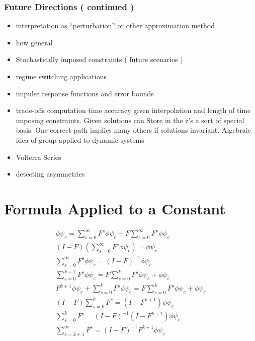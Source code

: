 \documentclass{beamer}
\begin{document}
   \begin{frame}
     \frametitle{Future Directions ( continued )}
     \begin{itemize}
\item interpretation as ``perturbation'' or other approximation method
\item how general
\item Stochastically imposed constraints ( future scenarios )
\item regime switching applications
\item impulse response functions and error bounds
\item trade-offs computation time accuracy given interpolation and length of time imposing constraints.  Given solutions can Store in the z's a sort of special basis. One correct path implies many others if solutions invariant.   Algebraic idea of group applied to dynamic systems
\item Volterra Series
\item detecting asymmetries
     \end{itemize}
   \end{frame}


   \begin{frame}





 
 
     
   \end{frame}






\newpage
\section{Formula Applied to a Constant}
{\tiny
\begin{gather*}
\phi \psi_c=  \sum_{s=0}^\infty F^s \phi \psi_c  -   F \sum_{s=0}^\infty F^s \phi \psi_c \\
(I-F) \left (\sum_{s=0}^\infty F^s \phi \psi_c \right ) =\phi \psi_c\\
\sum_{s=0}^\infty F^s \phi \psi_c=(I - F)^{-1}\phi \psi_c\\
\sum_{s=0}^{k+1} F^s \phi \psi_c=F \sum_{s=0}^{k} F^s \phi \psi_c + \phi \psi_c\\
F^{k+1} \phi \psi_c +\sum_{s=0}^{k} F^s \phi \psi_c=F \sum_{s=0}^{k} F^s \phi \psi_c + \phi \psi_c\\
(I -F)\sum_{s=0}^{k} F^s  = (I- F^{k+1}) \phi \psi_c\\
\sum_{s=0}^{k} F^s  = (I -F)^{-1}(I- F^{k+1}) \phi \psi_c\\
\sum_{s=k+1}^{\infty} F^s  = (I -F)^{-1} F^{k+1}\phi \psi_c
\end{gather*}
}
\end{document}
